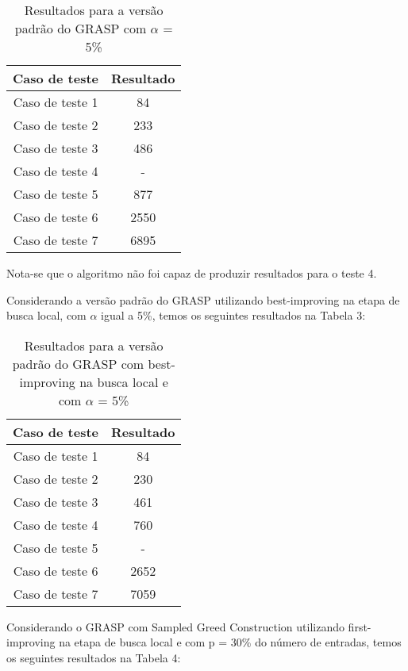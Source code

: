 \documentclass{article}
\begin{document}
\begin{table}[htbp]
\centering
\begin{tabular}{|c|c|}
\hline
\textbf{Caso de teste} & \textbf{Resultado} \\
\hline
Caso de teste 1 & 84 \\
Caso de teste 2 & 233 \\
Caso de teste 3 & 486\\
Caso de teste 4 &  - \\
Caso de teste 5 & 877 \\
Caso de teste 6 & 2550 \\
Caso de teste 7 & 6895 \\

\hline
\end{tabular}
\caption{Resultados para a versão padrão do GRASP com $\alpha$ = 5\%}
\label{tab:minha_tabela}
\end{table}

Nota-se que o algoritmo não foi capaz de produzir resultados para o teste 4.
    
Considerando a versão padrão do GRASP utilizando best-improving na etapa de busca local, com $\alpha$ igual a 5\%, temos os seguintes resultados na Tabela 3:

\begin{table}[htbp]
\centering
\begin{tabular}{|c|c|}
\hline
\textbf{Caso de teste} & \textbf{Resultado} \\
\hline
Caso de teste 1 & 84 \\
Caso de teste 2 & 230 \\
Caso de teste 3 & 461 \\
Caso de teste 4 & 760 \\
Caso de teste 5 & - \\
Caso de teste 6 & 2652 \\
Caso de teste 7 & 7059 \\

\hline
\end{tabular}
\caption{Resultados para a versão padrão do GRASP com best-improving na busca local e com $\alpha$ = 5\%}
\label{tab:minha_tabela}
\end{table}

Considerando o GRASP com Sampled Greed Construction utilizando first-improving na etapa de busca local e com p = 30\% do número de entradas, temos os seguintes resultados na Tabela 4:
\end{document}
